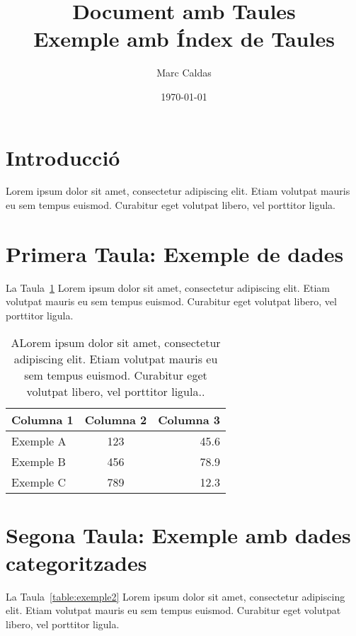 \documentclass[a4paper,12pt]{article}
\begin{document}
\title{\textbf{Document amb Taules} \\ \large Exemple amb Índex de Taules}
\author{Marc Caldas}
\date{\today}
\maketitle
\thispagestyle{empty}
\newpage

\listoftables
\newpage

\section{Introducció}
Lorem ipsum dolor sit amet, consectetur adipiscing elit. Etiam volutpat mauris eu sem tempus euismod. Curabitur eget volutpat libero, vel porttitor ligula.

\section{Primera Taula: Exemple de dades}
La Taula~\ref{table:exemple1} Lorem ipsum dolor sit amet, consectetur adipiscing elit. Etiam volutpat mauris eu sem tempus euismod. Curabitur eget volutpat libero, vel porttitor ligula.

\begin{table}[h!]
    \centering
    \begin{tabular}{|l|c|r|}
        \hline
        \textbf{Columna 1} & \textbf{Columna 2} & \textbf{Columna 3} \\ \hline
        Exemple A & 123 & 45.6 \\ \hline
        Exemple B & 456 & 78.9 \\ \hline
        Exemple C & 789 & 12.3 \\ \hline
    \end{tabular}
    \caption{ALorem ipsum dolor sit amet, consectetur adipiscing elit. Etiam volutpat mauris eu sem tempus euismod. Curabitur eget volutpat libero, vel porttitor ligula..}
    \label{table:exemple1}
\end{table}

\section{Segona Taula: Exemple amb dades categoritzades}
La Taula~\ref{table:exemple2} Lorem ipsum dolor sit amet, consectetur adipiscing elit. Etiam volutpat mauris eu sem tempus euismod. Curabitur eget volutpat libero, vel porttitor ligula.
\end{document}
